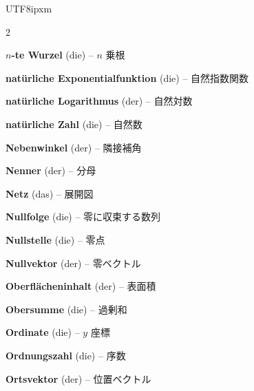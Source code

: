 \begin{CJK}{UTF8}{ipxm}
\begin{multicols}{2}
\par\nopagebreak
\textbf{$n$-te Wurzel} (die) -- $n$ 乗根\dotfill\hyperref[e:47]{\pageref*{e:47}}\par
\textbf{natürliche Exponentialfunktion} (die) -- 自然指数関数\dotfill\hyperref[e:299]{\pageref*{e:299}}\par
\textbf{natürliche Logarithmus} (der) -- 自然対数\dotfill\hyperref[e:300]{\pageref*{e:300}}\par
\textbf{natürliche Zahl} (die) -- 自然数\dotfill\hyperref[e:5]{\pageref*{e:5}}\par
\textbf{Nebenwinkel} (der) -- 隣接補角\dotfill\hyperref[e:163]{\pageref*{e:163}}\par
\textbf{Nenner} (der) -- 分母\dotfill\hyperref[e:30]{\pageref*{e:30}}\par
\textbf{Netz} (das) -- 展開図\dotfill\hyperref[e:253]{\pageref*{e:253}}\par
\textbf{Nullfolge} (die) -- 零に収束する数列\dotfill\hyperref[e:258]{\pageref*{e:258}}\par
\textbf{Nullstelle} (die) -- 零点\dotfill\hyperref[e:122]{\pageref*{e:122}}\par
\textbf{Nullvektor} (der) -- 零ベクトル\dotfill\hyperref[e:304]{\pageref*{e:304}}\par

\par\nopagebreak
\textbf{Oberflächeninhalt} (der) -- 表面積\dotfill\hyperref[e:256]{\pageref*{e:256}}\par
\textbf{Obersumme} (die) -- 過剰和\dotfill\hyperref[e:293]{\pageref*{e:293}}\par
\textbf{Ordinate} (die) -- $y$ 座標\dotfill\hyperref[e:118]{\pageref*{e:118}}\par
\textbf{Ordnungszahl} (die) -- 序数\dotfill\hyperref[e:3]{\pageref*{e:3}}\par
\textbf{Ortsvektor} (der) -- 位置ベクトル\dotfill\hyperref[e:302]{\pageref*{e:302}}\par


\end{multicols}
\end{CJK}
